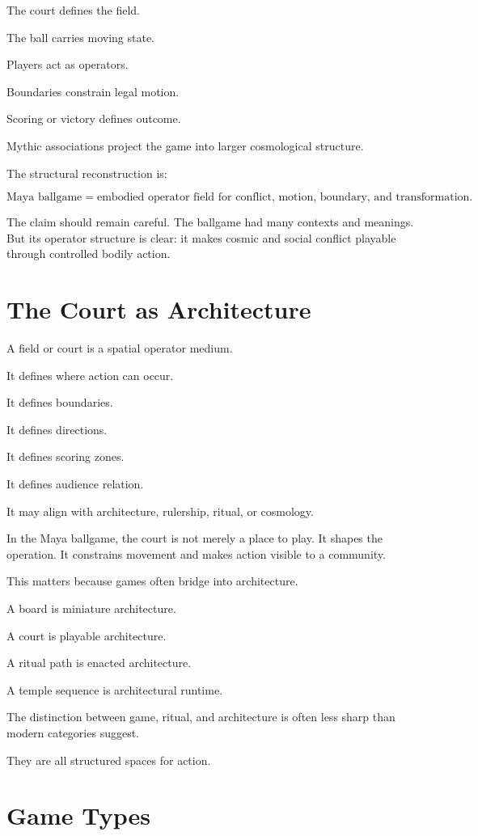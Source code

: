 \documentclass[11pt]{book}
\begin{document}
The court defines the field.

The ball carries moving state.

Players act as operators.

Boundaries constrain legal motion.

Scoring or victory defines outcome.

Mythic associations project the game into larger cosmological structure.

The structural reconstruction is:

\[
\text{Maya ballgame} = \text{embodied operator field for conflict, motion, boundary, and transformation}.
\]

The claim should remain careful. The ballgame had many contexts and meanings. But its operator structure is clear: it makes cosmic and social conflict playable through controlled bodily action.

\section{The Court as Architecture}

A field or court is a spatial operator medium.

It defines where action can occur.

It defines boundaries.

It defines directions.

It defines scoring zones.

It defines audience relation.

It may align with architecture, rulership, ritual, or cosmology.

In the Maya ballgame, the court is not merely a place to play. It shapes the operation. It constrains movement and makes action visible to a community.

This matters because games often bridge into architecture.

A board is miniature architecture.

A court is playable architecture.

A ritual path is enacted architecture.

A temple sequence is architectural runtime.

The distinction between game, ritual, and architecture is often less sharp than modern categories suggest.

They are all structured spaces for action.

\section{Game Types}
\end{document}
